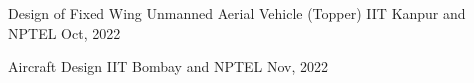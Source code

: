 

\begin{cvhonors}



  \cvhonor
  {Design of Fixed Wing Unmanned Aerial Vehicle (Topper)} %
  {IIT Kanpur and NPTEL} %
  {} %
  {Oct, 2022} %


  \cvhonor
  {Aircraft Design} %
  {IIT Bombay and NPTEL} %
  {} %
  {Nov, 2022} %



\end{cvhonors}
